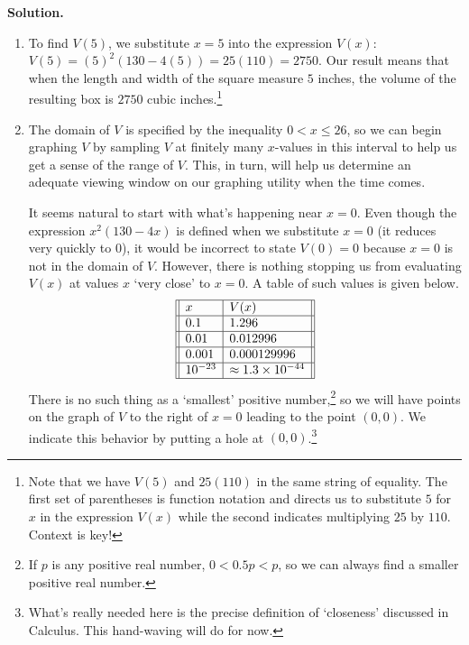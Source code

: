 \begin{ex}
\begin{enumerate}
\end{enumerate}
{\bf Solution.}

\begin{enumerate}

\item To find $V(5)$, we substitute $x=5$ into the expression $V(x)$:  $V(5) = (5)^2 (130-4(5)) = 25(110) = 2750$.   Our result means that when the length and width of the square  measure $5$ inches, the volume of the resulting box is $2750$ cubic inches.\footnote{Note that we have $V(5)$ and $25(110)$ in the same string of equality. The first set of parentheses is function notation and directs us to substitute $5$ for $x$ in the expression $V(x)$ while the second indicates multiplying $25$ by $110$. Context is key!}

\item The domain of $V$ is specified by the inequality  $0 < x \leq 26$, so we can begin graphing $V$ by sampling  $V$ at finitely many $x$-values in this interval to help us get a sense of the range of $V$. This, in turn, will help us determine an adequate viewing window on our graphing utility when the time comes.

It seems natural to start with what's happening near $x = 0$.  Even though the expression $x^2 (130-4x)$  is defined when we substitute $x = 0$ (it reduces very quickly to $0$), it would be incorrect to state $V(0) = 0$ because $x = 0$ is not in the domain of $V$.  However,  there is nothing stopping us from evaluating $V(x)$ at values $x$ `very close' to $x = 0$.  A table of such values is given below. \[ \begin{array}{||l|l||} \hline 
        x & V(x) \\ \hline
      0.1 & 1.296 \\ \hline
     0.01 & 0.012996 \\ \hline
    0.001 & 0.000129996 \\ \hline
10^{-23} & \approx 1.3 \times 10^{-44} \\ \hline

\end{array} \] There is no such thing as a  `smallest' positive number,\footnote{If $p$ is any positive real number, $0 < 0.5 p < p$, so we can always find a smaller positive real number.}  so we will have points on the graph of $V$ to the right of $x = 0$ leading to the point $(0,0)$.  We indicate this behavior by putting a hole at $(0,0)$.\footnote{What's really needed here is the precise definition of `closeness' discussed in Calculus.  This hand-waving will do for now.}


\end{enumerate}
\end{ex}
